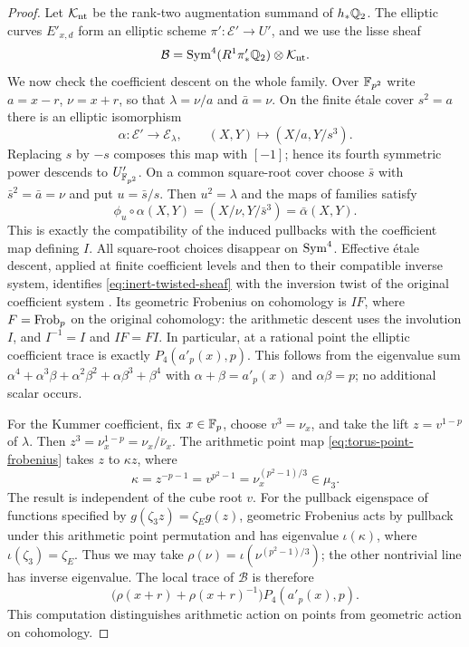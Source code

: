 \begin{proof}
Let $\mathcal K_{\mathrm{nt}}$ be the rank-two augmentation summand of
$h_*\mathbb Q_2$. The elliptic curves $E'_{x,d}$ form an elliptic scheme
$\pi':\mathcal E'\to U'$, and we use the lisse sheaf
\begin{equation}\label{eq:inert-twisted-sheaf}
 \mathcal B=\operatorname{Sym}^4(R^1\pi'_*\mathbb Q_2)\otimes\mathcal K_{\mathrm{nt}}.
\end{equation}
We now check the coefficient descent on the whole family.
Over $\mathbb F_{p^2}$ write $a=x-r$, $\nu=x+r$, so that
$\lambda=\nu/a$ and $\bar a=\nu$. On the finite \'{e}tale
cover $s^2=a$ there is an elliptic isomorphism
\[
 \alpha:\mathcal E'\longrightarrow\mathcal E_\lambda,
 \qquad (X,Y)\longmapsto(X/a,Y/s^3).
\]
Replacing $s$ by $-s$ composes this map with $[-1]$; hence its
fourth symmetric power descends to $U'_{\mathbb F_{p^2}}$.
On a common square-root cover choose $\bar s$ with
$\bar s^2=\bar a=\nu$ and put $u=\bar s/s$. Then $u^2=\lambda$
and the maps of families satisfy
\begin{equation}\label{eq:inert-family-cocycle}
 \phi_u\circ\alpha(X,Y)
  =(X/\nu,Y/\bar s^3)=\bar\alpha(X,Y).
\end{equation}
This is exactly the compatibility of the induced pullbacks with
the coefficient map defining $I$. All square-root choices disappear
on $\operatorname{Sym}^4$. Effective \'{e}tale descent, applied at finite
coefficient levels and then to their compatible inverse system,
identifies \eqref{eq:inert-twisted-sheaf} with the inversion twist
of the original coefficient system \cite{StacksDescent}.
Its geometric Frobenius on cohomology is $IF$, where
$F=\operatorname{Frob}_p$ on the original cohomology: the arithmetic descent
uses the involution $I$, and $I^{-1}=I$ and $IF=FI$.
In particular, at a rational point the elliptic coefficient trace is
exactly $P_4(a'_p(x),p)$. This follows from the eigenvalue sum
$\alpha^4+\alpha^3\beta+\alpha^2\beta^2+\alpha\beta^3+\beta^4$
with $\alpha+\beta=a'_p(x)$ and $\alpha\beta=p$; no additional
scalar occurs.

For the Kummer coefficient, fix $x\in\mathbb F_p$, choose $v^3=\nu_x$,
and take the lift $z=v^{1-p}$ of $\lambda$. Then
$z^3=\nu_x^{1-p}=\nu_x/\bar\nu_x$. The arithmetic point map
\eqref{eq:torus-point-frobenius} takes $z$ to $\kappa z$, where
\begin{equation}\label{eq:inert-kummer-weight}
 \kappa=z^{-p-1}=v^{p^2-1}
        =\nu_x^{(p^2-1)/3}\in\mu_3.
\end{equation}
The result is independent of the cube root $v$.
For the pullback eigenspace of functions specified by
$g(\zeta_3z)=\zeta_E g(z)$, geometric Frobenius acts by pullback
under this arithmetic point permutation and has eigenvalue
$\iota(\kappa)$, where $\iota(\zeta_3)=\zeta_E$. Thus we may take
$\rho(\nu)=\iota(\nu^{(p^2-1)/3})$; the other nontrivial line
has inverse eigenvalue. The local trace of $\mathcal B$ is therefore
\begin{equation}\label{eq:inert-local-trace}
 \bigl(\rho(x+r)+\rho(x+r)^{-1}\bigr)P_4(a'_p(x),p).
\end{equation}
This computation distinguishes arithmetic action on points from
geometric action on cohomology.


\end{proof}
